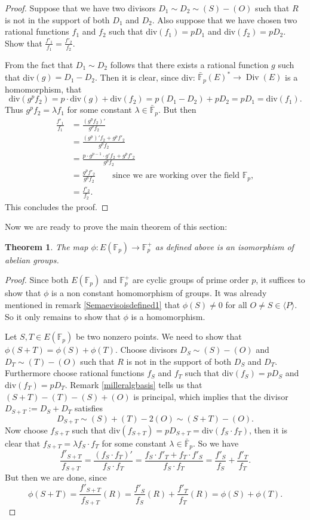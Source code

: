 \documentclass{article}
\numberwithin{equation}{section}
\newtheorem{theorem}{Theorem}[subsection]
\theoremstyle{definition}
\newcommand{\FF}[1]{{\mathbb F}_{#1}} %
\newcommand{\FFCL}[1]{{\bar {\mathbb F}}_{#1}} %
\newcommand{\grgen}[1]{\langle #1 \rangle} %
\newcommand{\Div}{\operatorname{Div}} %
\begin{document}
\begin{proof}
Suppose that we have two divisors $D_1 \sim D_2 \sim (S)-(O)$ such that $R$ is not in the support of both $D_1$ and $D_2$. Also suppose that we have chosen two rational functions $f_1$ and $f_2$ such that div$(f_1) =pD_1$ and div$(f_2)=pD_2$. Show that $\frac{f'_1}{f_1} = \frac{f'_2}{f_2}$.\par 
From the fact that $D_1 \sim D_2$ follows that there exists a rational function $g$ such that div$(g)=D_1-D_2$.  Then it is clear, since div: $\FFCL{p}(E)^* \rightarrow \Div(E)$ is a homomorphism, that $$\text{div}(g^pf_2)=p\cdot \text{div}(g)+\text{div}(f_2) = p(D_1-D_2)+pD_2= pD_1=\text{div}(f_1).$$ Thus $g^pf_2 =\lambda f_1$ for some constant $\lambda \in \FFCL{p}$. But then 
\begin{align*} \frac{f'_1}{f_1}&=\frac{(g^pf_2)'}{g^pf_2}\\ &=\frac{(g^p)'f_2+g^pf'_2}{g^pf_2}\\ &=\frac{p\cdot g^{p-1}\cdot g' f_2+g^pf'_2}{g^pf_2}\\ &=\frac{g^pf'_2}{g^pf_2} \qquad \text{since we are working over the field }\FF{p},\\ &=\frac{f'_2}{f_2}.\end{align*} 
This concludes the proof.
\end{proof}

Now we are ready to prove the main theorem of this section:

\begin{theorem}
The map $\phi:E(\FF{p}) \rightarrow \FF{p}^+$ as defined above is an isomorphism of abelian groups.
\end{theorem}

\begin{proof}
Since both $E(\FF{p})$ and $\FF{p}^+$ are cyclic groups of prime order $p$, it suffices to show that $\phi$ is a non constant homomorphism of groups. It was already mentioned in remark \ref{Semaevisoisdefined1} that $\phi(S) \neq 0$ for all $O \neq S \in \grgen{P}$. So it only remains to show that $\phi$ is a homomorphism.\par 
Let $S,T \in E(\FF{p})$ be two nonzero points. We need to show that $\phi(S+T)=\phi(S)+\phi(T)$. Choose divisors $D_S \sim (S)-(O)$ and $D_T \sim (T)-(O)$ such that $R$ is not in the support of both $D_S$ and $D_T$. Furthermore choose rational functions $f_S$ and $f_T$ such that div$(f_S)=pD_S$ and div$(f_T)=pD_T$. Remark \ref{milleralgbasis} tells us that $(S+T)-(T)-(S)+(O)$ is principal, which implies that the divisor $D_{S+T} := D_S+D_T$ satisfies $$D_{S+T} \sim (S)+(T)-2(O) \sim (S+T)-(O).$$ Now choose $f_{S+T}$ such that div$(f_{S+T}) = pD_{S+T}=\text{div}(f_S\cdot f_T)$, then it is clear that $f_{S+T}=\lambda f_S\cdot f_T$ for some constant $\lambda \in \FFCL{p}$. So we have $$\frac{f'_{S+T}}{f_{S+T}}=\frac{(f_S\cdot f_T)'}{f_S\cdot f_T}=\frac{f_S\cdot f'_T+f_T\cdot f'_S}{f_S\cdot f_T}=\frac{f'_S}{f_S}+\frac{f'_T}{f_T}.$$ But then we are done, since $$\phi(S+T)=\frac{f'_{S+T}}{f_{S+T}}(R)= \frac{f'_S}{f_S}(R)+\frac{f'_T}{f_T}(R)=\phi(S)+\phi(T).$$
\end{proof}
\end{document}
